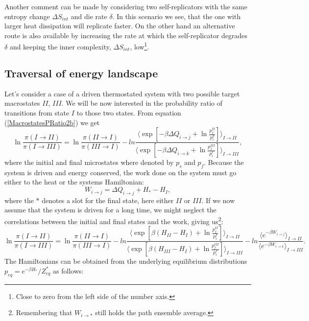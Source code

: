 \documentclass[a4paper,12pt]{article}
\begin{document}
Another comment can be made by considering two self-replicators with the same entropy change $\Delta S_{int}$ and die rate $\delta$. In this scenario we see, that the one with larger heat dissipation will replicate faster.
On the other hand an alternative route is also available by increasing the rate at which the self-replicator degrades $\delta $ and keeping the inner complexity, $\Delta S_{int}$, low\footnote{Close to zero from the left side of the number axis.}.

\subsection{Traversal of energy landscape }

Let's consider a case of a driven thermostated system with two possible target macrostates $II$, $III$. We will be now interested in the probability ratio of transitions from state $I$ to those two states. From equation (\ref{MacrostatesPRatio2b}) we get
\begin{equation}
  \ln \frac{\pi(I \to II)}{\pi(I \to III)} = \ln \frac{\pi(II \to I)}{\pi(III \to I)}- ln \frac{ \langle \exp[-\beta \Delta Q_{i \to j} + \ln \frac{p_f^{II}}{p_i^{I}}] \rangle_{I \to II}}{ \langle \exp[-\beta \Delta Q_{i \to k} + \ln \frac{p_f^{III}}{p_i^{I}}] \rangle_{I \to III}},
\end{equation}
where the initial and final microstates where denoted by $p_s$ and $p_f$.
Because the system is driven and energy conserved, the work done on the system must go either to the heat or the systems Hamiltonian:
\begin{equation}
  W_{i \to j}=  \Delta Q_{i \to j} + H_*- H_I,
\end{equation}
where the $*$ denotes a slot for the final state, here either $II$ or $III$.
If we now assume that the system is driven for a long time, we might neglect the correlations between the initial and final states and the work, giving us\footnote{Remembering that $W_{i \to *}$ still holds the path ensemble average.}:
\begin{equation}
  \ln \frac{\pi(I \to II)}{\pi(I \to III)} = \ln \frac{\pi(II \to I)}{\pi(III \to I)}- ln \frac{ \langle \exp[\beta (H_{II}-H_I) + \ln \frac{p_f^{II}}{p_i^{I}}] \rangle_{I \to II}}{ \langle \exp[\beta (H_{III}-H_I) + \ln \frac{p_f^{III}}{p_i^{I}}] \rangle_{I \to III}}-ln \frac{\langle e^{ - \beta W_{i \to j}} \rangle_{I \to II}}{\langle e^{ - \beta W_{i \to k}} \rangle_{I \to III}}.
\end{equation}
The Hamiltonians can be obtained from the underlying equilibrium distributions $p_{eq}= e^{-\beta H_*}/Z_{eq}^*$ as follows:
\end{document}
